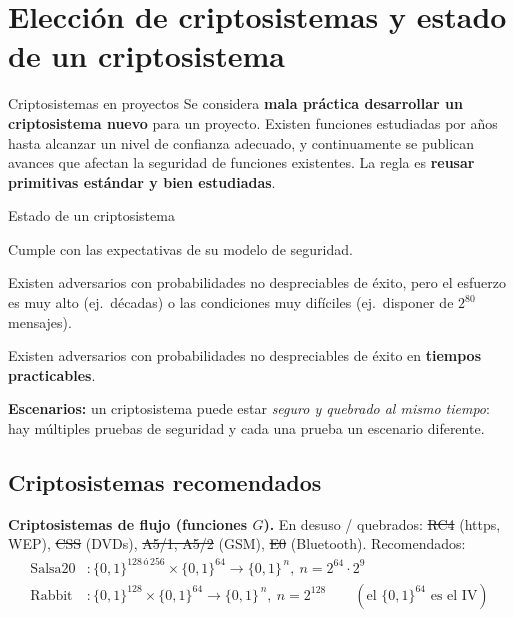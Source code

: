 \documentclass[11pt,a4paper]{article}
\newcommand{\bits}{\{0,1\}}
\begin{document}
\section{Elección de criptosistemas y estado de un criptosistema}

\begin{warnbox}{Criptosistemas en proyectos}
Se considera \textbf{mala práctica desarrollar un criptosistema nuevo} para un proyecto.
Existen funciones estudiadas por años hasta alcanzar un nivel de confianza adecuado, y
continuamente se publican avances que afectan la seguridad de funciones existentes. La
regla es \textbf{reusar primitivas estándar y bien estudiadas}.
\end{warnbox}

\begin{defbox}{Estado de un criptosistema}
\begin{description}[leftmargin=0pt,style=nextline,itemsep=3pt]
  \item[Seguro.] Cumple con las expectativas de su modelo de seguridad.
  \item[Debilitado.] Existen adversarios con probabilidades no despreciables de éxito,
        pero el esfuerzo es muy alto (ej.\ décadas) o las condiciones muy difíciles
        (ej.\ disponer de $2^{80}$ mensajes).
  \item[Quebrado.] Existen adversarios con probabilidades no despreciables de éxito en
        \textbf{tiempos practicables}.
\end{description}
\textbf{Escenarios:} un criptosistema puede estar \emph{seguro y quebrado al mismo
tiempo}: hay múltiples pruebas de seguridad y cada una prueba un escenario diferente.
\end{defbox}

\subsection{Criptosistemas recomendados}

\begin{slidebox}
\textbf{Criptosistemas de flujo (funciones $G$).} En desuso / quebrados:
\sout{RC4} (https, WEP), \sout{CSS} (DVDs), \sout{A5/1, A5/2} (GSM), \sout{E0}
(Bluetooth). Recomendados:
\[
\begin{aligned}
  \text{Salsa20}&: \bits^{128\,\text{ó}\,256}\times\bits^{64}\to\bits^{\,n},\ n=2^{64}\cdot 2^9\\
  \text{Rabbit}&: \bits^{128}\times\bits^{64}\to\bits^{\,n},\ n=2^{128}\qquad(\text{el }
        \bits^{64}\text{ es el IV})
\end{aligned}
\]
\end{slidebox}
\end{document}

